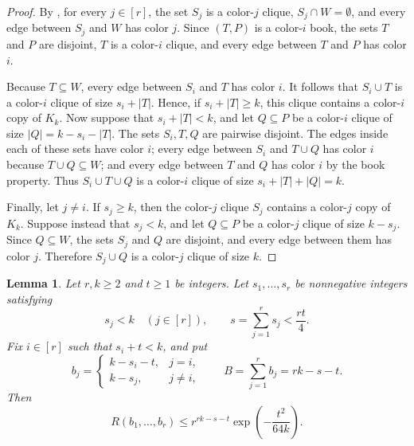 \documentclass[twoside,12pt]{article}
\newtheorem{lemma}[theorem]{Lemma}
\theoremstyle{definition}
\theoremstyle{remark}
\newcommand{\1}{\mathbf 1}
\begin{document}
\begin{proof}
By , for every $j\in[r]$, the set $S_j$ is a
color-$j$ clique, $S_j\cap W=\emptyset$, and every edge between $S_j$ and
$W$ has color $j$. Since $(T,P)$ is a color-$i$ book, the sets $T$ and $P$
are disjoint, $T$ is a color-$i$ clique, and every edge between $T$ and $P$
has color $i$.

Because $T\subseteq W$, every edge between $S_i$ and $T$ has color $i$.
It follows that $S_i\cup T$ is a color-$i$ clique of size $s_i+|T|$. Hence,
if $s_i+|T|\ge k$, this clique contains a color-$i$ copy of $K_k$.
Now suppose that $s_i+|T|<k$, and let $Q\subseteq P$ be a color-$i$ clique
of size
$
 |Q|=k-s_i-|T|.
$
The sets $S_i,T,Q$ are pairwise disjoint. The edges inside each of these sets
have color $i$; every edge between $S_i$ and $T\cup Q$ has color $i$ because
$T\cup Q\subseteq W$; and every edge between $T$ and $Q$ has color $i$ by
the book property. Thus $S_i\cup T\cup Q$ is a color-$i$ clique of size
$s_i+|T|+|Q|=k.
$

Finally, let $j\ne i$. If $s_j\ge k$, then the color-$j$ clique $S_j$
contains a color-$j$ copy of $K_k$. Suppose instead that $s_j<k$, and let
$Q\subseteq P$ be a color-$j$ clique of size $k-s_j$. Since $Q\subseteq W$,
the sets $S_j$ and $Q$ are disjoint, and every edge between them has color
$j$. Therefore $S_j\cup Q$ is a color-$j$ clique of size $k$.
\end{proof}

\begin{lemma}\label{lem:entropy-loss}
Let $r,k\ge2$ and $t\ge1$ be integers. Let $s_1,\ldots,s_r$ be nonnegative
integers satisfying
\[
 s_j<k\quad(j\in[r]),
 \qquad
 s=\sum_{j=1}^rs_j<\frac{rt}{4}.
\]
Fix $i\in[r]$ such that $s_i+t<k$, and put
\[
 b_j=
 \begin{cases}
  k-s_i-t,&j=i,\\
  k-s_j,&j\ne i,
 \end{cases}
 \qquad
 B=\sum_{j=1}^rb_j=rk-s-t.
\]
Then
\begin{equation}\label{eq:entropy-loss}
 R(b_1,\ldots,b_r)
 \le r^{rk-s-t}\exp\!\left(-\frac{t^2}{64k}\right).
\end{equation}
\end{lemma}
\end{document}

